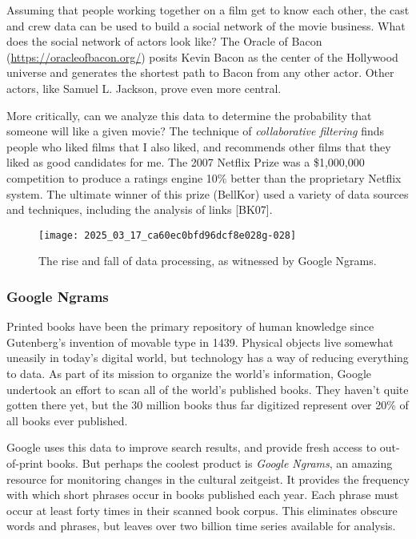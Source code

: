 \documentclass[10pt]{article}
\begin{document}
Assuming that people working together on a film get to know each other, the cast and crew data can be used to build a social network of the movie business. What does the social network of actors look like? The Oracle of Bacon (\href{https://oracleofbacon.org/}{https://oracleofbacon.org/}) posits Kevin Bacon as the center of the Hollywood universe and generates the shortest path to Bacon from any other actor. Other actors, like Samuel L. Jackson, prove even more central.

More critically, can we analyze this data to determine the probability that someone will like a given movie? The technique of \textit{collaborative filtering} finds people who liked films that I also liked, and recommends other films that they liked as good candidates for me. The 2007 Netflix Prize was a \$1,000,000 competition to produce a ratings engine 10\% better than the proprietary Netflix system. The ultimate winner of this prize (BellKor) used a variety of data sources and techniques, including the analysis of links [BK07].

\begin{figure}[h]
    \centering
    \texttt{[image: 2025\_03\_17\_ca60ec0bfd96dcf8e028g-028]}
    \caption{The rise and fall of data processing, as witnessed by Google Ngrams.}
\end{figure}

\subsubsection*{Google Ngrams}
Printed books have been the primary repository of human knowledge since Gutenberg's invention of movable type in 1439. Physical objects live somewhat uneasily in today's digital world, but technology has a way of reducing everything to data. As part of its mission to organize the world's information, Google undertook an effort to scan all of the world's published books. They haven't quite gotten there yet, but the 30 million books thus far digitized represent over 20\% of all books ever published.

Google uses this data to improve search results, and provide fresh access to out-of-print books. But perhaps the coolest product is \textit{Google Ngrams}, an amazing resource for monitoring changes in the cultural zeitgeist. It provides the frequency with which short phrases occur in books published each year. Each phrase must occur at least forty times in their scanned book corpus. This eliminates obscure words and phrases, but leaves over two billion time series available for analysis.
\end{document}
